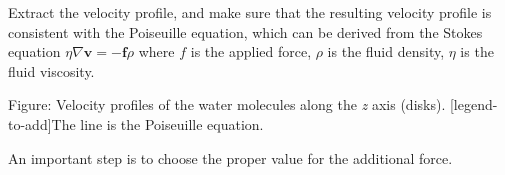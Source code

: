 \vspace{0.25cm} \noindent Extract the velocity profile, and make sure that the
resulting velocity profile is consistent with the Poiseuille equation,
which can be derived from the Stokes equation $\eta \nabla \textbf{v} = - \textbf{f} \rho$
where $f$ is the applied force,
$\rho$ is the fluid density,
$\eta$ is the fluid viscosity.

\vspace{0.25cm} Figure: Velocity profiles of the water molecules along the \textit{z} axis (disks).
[legend-to-add]The line is the Poiseuille equation.

\vspace{0.25cm} \noindent An important step is to choose the proper value for the additional force.

